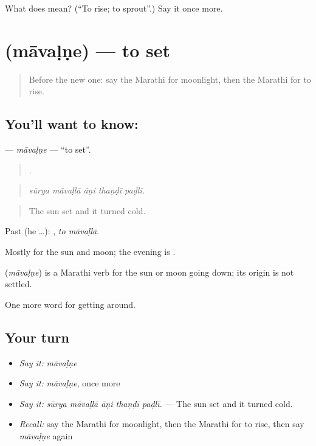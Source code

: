 \begin{tcolorbox}[breakable,colback=teal!4,colframe=teal!35!black,title={Before you move on}]
What does  mean? (\textquotedblleft{}To rise; to sprout\textquotedblright{}.) Say it once more.
\end{tcolorbox}
\section[\texorpdfstring{\mr{मावळणे} (māvaḷṇe)}{मावळणे (māvaḷṇe)}]{ (māvaḷṇe) — to set}

\label{lesson:MR-C441-mavalne}



\begin{quote}
Before the new one: say the Marathi for moonlight, then the Marathi for to rise.
\end{quote}

\subsection*{You'll want to know: }
\textbf{} — \emph{māvaḷṇe} — \textquotedblleft{}to set\textquotedblright{}.

\begin{quote}
    .
\end{quote}

\begin{quote}
\emph{sūrya māvaḷlā āṇi thaṇḍī paḍlī.}
\end{quote}

\begin{quote}
The sun set and it turned cold.
\end{quote}

Past (he …):  , \emph{to māvaḷlā}.

Mostly for the sun and moon; the evening is  .

\begin{cousinweb}
\textbf{} (\emph{māvaḷṇe}) is a Marathi verb for the sun or moon going down; its origin is not settled.
\end{cousinweb}

\begin{grammarlens}[title={What you've built}]
One more word for getting around.
\end{grammarlens}

\subsection*{Your turn}
\begin{itemize}
\raggedright
  \item \emph{Say it:} \emph{māvaḷṇe}
  \item \emph{Say it:} \emph{māvaḷṇe}, once more
  \item \emph{Say it:} \emph{sūrya māvaḷlā āṇi thaṇḍī paḍlī.} — The sun set and it turned cold.
  \item \emph{Recall:} say the Marathi for moonlight, then the Marathi for to rise, then say \emph{māvaḷṇe} again
\end{itemize}

